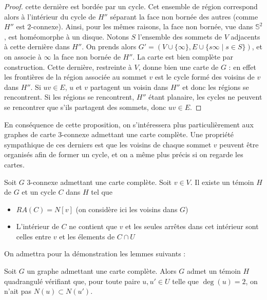 \documentclass{scrartcl}
\begin{document}
\begin{flushleft}
\begin{proof}
    cette dernière est bordée par un cycle. Cet ensemble de région correspond alors à l'intérieur du cycle de $H''$
    séparant la face non bornée des autres (comme $H''$ est $2$-connexe). Ainsi, pour les mêmes raisons, la face non bornée, vue dans $\mathbb{S}^2$,
    est homéomorphe à un disque. Notons $S$ l'ensemble des sommets de $V$ adjacents à cette dernière dans $H''$.
    On prends alors $G' = (V \cup \{\infty\}, E \cup \{s\infty \mid s \in S \} )$, et on associe à $\infty$ la face non bornée de $H''$.
    La carte est bien complète par construction. Cette dernière, restreinte à $V$, donne bien une carte de $G$ : en effet les frontières
    de la région associée au sommet $v$ est le cycle formé des voisins de $v$ dans $H''$. Si $uv \in E$, $u$ et $v$ partagent un voisin
    dans $H''$ et donc les régions se rencontrent. Si les régions se rencontrent, $H''$ étant planaire, les cycles ne peuvent se rencontrer
    que s'ils partagent des sommets, donc $uv \in E$.

\end{proof}

En conséquence de cette proposition, on s'intéressera plus particulièrement aux graphes de carte $3$-connexe admettant une carte complète.
Une propriété sympathique de ces derniers est que les voisins de chaque sommet $v$ peuvent être organisés afin
de former un cycle, et on a même plus précis si on regarde les cartes.

\begin{prop}\label{cyclSep}
    Soit $G$ $3$-connexe admettant une carte complète. Soit $v \in V$. Il existe un témoin $H$ de $G$ et
    un cycle $C$ dans $H$ tel que
    \begin{itemize}
        \item $RA(C) = N[v]$ (on considère ici les voisins dans $G$)
        \item L'intérieur de $C$ ne contient que $v$ et les seules arrêtes dans cet intérieur sont celles entre $v$ et
        les élements de $C \cap U$
    \end{itemize}
\end{prop}

On admettra pour la démonstration les lemmes suivants :
\begin{lem}
    Soit $G$ un graphe admettant une carte complète. Alors $G$ admet un témoin $H$ quadrangulé vérifiant que, pour toute paire
    $u, u' \in U$ telle que $\deg(u) = 2$, on n'ait pas $N(u) \subset N(u')$.
\end{lem}


\end{flushleft}
\end{document}
